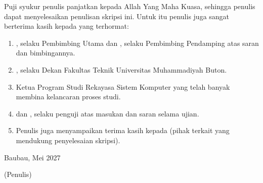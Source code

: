 Puji syukur penulis panjatkan kepada Allah Yang Maha Kuasa, sehingga penulis dapat menyelesaikan penulisan skripsi ini. Untuk itu penulis juga sangat berterima kasih kepada yang terhormat:
\begin{enumerate}
\item \PembimbingI, selaku Pembimbing Utama dan \PembimbingII, selaku Pembimbing Pendamping atas saran dan bimbingannya.
\item \Dekan, selaku Dekan Fakultas Teknik Universitas Muhammadiyah Buton.
\item Ketua Program Studi Rekayasa Sistem Komputer yang telah banyak membina kelancaran proses studi.
\item \PengujiI{} dan \PengujiII, selaku penguji atas masukan dan saran selama ujian.
\item Penulis juga menyampaikan terima kasih kepada (pihak terkait yang mendukung penyelesaian skripsi).
\end{enumerate}

\begin{kanan}
Baubau, Mei 2027

(Penulis)
\end{kanan}

